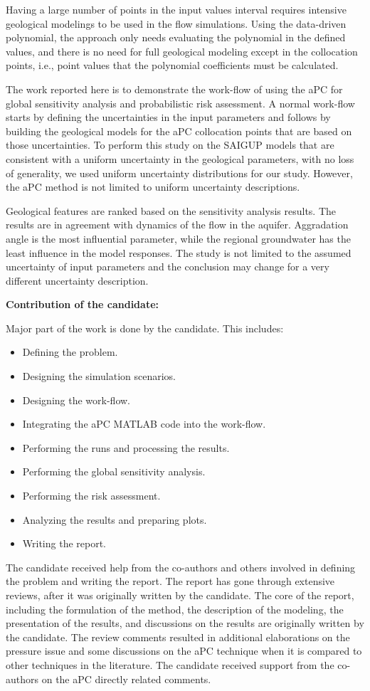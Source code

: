 {Having a large number of points in the input values interval requires
intensive geological modelings to be used in the flow simulations. Using the
data-driven polynomial, the approach only needs evaluating the polynomial in the
defined values, and there is no need for full geological modeling except in
the collocation points, i.e., point values that the polynomial coefficients must
be calculated. 

The work reported here is to demonstrate the work-flow of using the aPC for
global sensitivity analysis and probabilistic risk assessment. A normal
work-flow starts by defining the uncertainties in the input parameters and
follows by building the geological models for the aPC collocation points that are based on those uncertainties.
To perform this study on the SAIGUP models that are consistent
with a uniform uncertainty in the geological parameters, with no loss of
generality, we used uniform uncertainty distributions for our study. However,
the aPC method is not limited to uniform uncertainty descriptions.

Geological features are ranked based on the sensitivity analysis results. The
results are in agreement with dynamics of the flow in the aquifer. Aggradation
angle is the most influential parameter, while the regional groundwater has the
least influence in the model responses. The study is not limited to the assumed
uncertainty of input parameters and the conclusion may change for a very
different uncertainty description. 

\vspace{0.5cm}
\noindent\textbf{Contribution of the candidate:}

Major part of the work is done by the candidate. This includes:

\begin{itemize}
\item Defining the problem.
\item Designing the simulation scenarios.
\item Designing the work-flow.
\item Integrating the aPC MATLAB code into the work-flow.
\item Performing the runs and processing the results.
\item Performing the global sensitivity analysis.
\item Performing the risk assessment.
\item Analyzing the results and preparing plots.
\item Writing the report.
\end{itemize}

The candidate received help from the co-authors and others involved in defining the problem and writing the report. The report has gone through extensive reviews, after it was originally written by the candidate. The core of the report, including the formulation of the method, the description of the modeling, the presentation of the results, and discussions on the results are originally written by the candidate. The review comments resulted in additional elaborations on the pressure issue and some discussions on the aPC technique when it is compared to other techniques in the literature. The candidate received support from the co-authors on the aPC directly related comments. 
}
